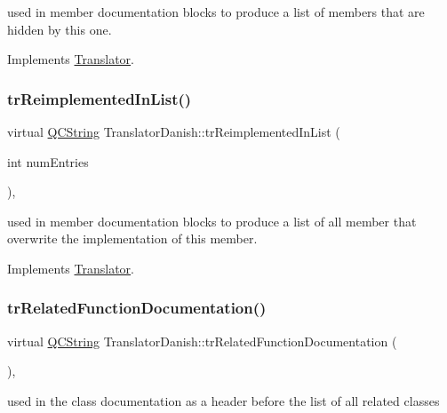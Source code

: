 used in member documentation blocks to produce a list of members that are hidden by this one. 

Implements \mbox{\hyperlink{class_translator}{Translator}}.

\mbox{\label{class_translator_danish_a25fc08a37c87825457da45c9b381f24a}} 
\subsubsection{\texorpdfstring{trReimplementedInList()}{trReimplementedInList()}}
{\footnotesize\ttfamily virtual \mbox{\hyperlink{class_q_c_string}{Q\+C\+String}} Translator\+Danish\+::tr\+Reimplemented\+In\+List (\begin{DoxyParamCaption}\item[{int}]{num\+Entries }\end{DoxyParamCaption})\hspace{0.3cm}{\ttfamily [inline]}, {\ttfamily [virtual]}}

used in member documentation blocks to produce a list of all member that overwrite the implementation of this member. 

Implements \mbox{\hyperlink{class_translator}{Translator}}.

\mbox{\label{class_translator_danish_a6d72c03f3e8ce22c544e6221eeeb61cf}} 
\subsubsection{\texorpdfstring{trRelatedFunctionDocumentation()}{trRelatedFunctionDocumentation()}}
{\footnotesize\ttfamily virtual \mbox{\hyperlink{class_q_c_string}{Q\+C\+String}} Translator\+Danish\+::tr\+Related\+Function\+Documentation (\begin{DoxyParamCaption}{ }\end{DoxyParamCaption})\hspace{0.3cm}{\ttfamily [inline]}, {\ttfamily [virtual]}}

used in the class documentation as a header before the list of all related classes 


